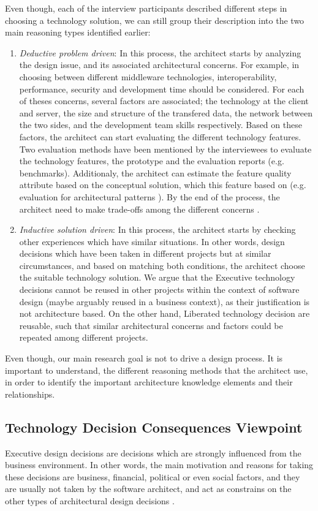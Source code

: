 \documentclass[conference]{IEEEtran}
\begin{document}
Even though, each of the interview participants described different steps in
choosing a technology solution, we can still group their description into the
two main reasoning types identified earlier:
\begin{enumerate}
\item \textit{Deductive problem driven}: In this process, the architect starts
by analyzing the design issue, and its associated architectural concerns.
For example, in choosing between different middleware technologies,
interoperability, performance, security and development time should be
considered. For each of theses concerns, several factors are associated; the
technology at the client and server, the size and structure of the transfered
data, the network between the two sides, and the development team skills
respectively. Based on these factors, the architect can start evaluating the
different technology features. Two evaluation methods have been mentioned
by the interviewees to evaluate the technology features, the prototype and the
evaluation reports (e.g. benchmarks). Additionaly, the architect can estimate
the feature quality attribute based on the conceptual solution, which this feature
based on (e.g. evaluation for architectural patterns \cite{Bode2010}). By the
end of the process, the architect need to make trade-offs among the different
concerns \cite{BabarICSE2005}.
\item \textit{Inductive solution driven}: In this process, the architect starts
by checking other experiences which have similar situations. In other words,
design decisions which have been taken in different projects but at similar
circumstances, and based on matching both conditions, the architect choose the
suitable technology solution. We argue that the Executive technology
decisions cannot be reused in other projects within the context of software
design (maybe arguably reused in a business context), as their justification is
not architecture based. On the other hand, Liberated technology decision are
reusable, such that similar architectural concerns and factors could be repeated
among different projects.
\end{enumerate}
Even though, our main research goal is not to drive a design process. It is
important to understand, the different reasoning methods that the architect use,
in order to identify the important architecture knowledge elements and their
relationships.
\subsection{Technology Decision Consequences Viewpoint}
\label{sec:consequence}
Executive design decisions are decisions which are strongly influenced from the
business environment. In other words, the main motivation and reasons for taking
these decisions are business, financial, political or even social factors, and
they are usually not taken by the software architect, and act as constrains
on the other types of architectural design decisions \cite{Kruchten2006}.
\end{document}
